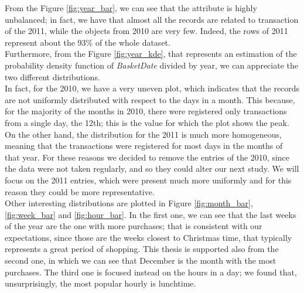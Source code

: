 From the Figure \ref{fig:year_bar}, we can see that the attribute is highly unbalanced; in fact, we have that almost all the records are related to transaction of the 2011, while the objects from 2010 are very few. Indeed, the rows of 2011 represent about the 93\% of the whole dataset. \\
Furthermore, from the Figure \ref{fig:year_kde}, that represents an estimation of the probability density function of \emph{BasketDate} divided by year, we can appreciate the two different distributions.\\
In fact, for the 2010, we have a very uneven plot, which indicates that the records are not uniformly distributed with respect to the days in a month. This because, for the majority of the months in 2010, there were registered only transactions from a single day, the 12th; this is the value for which the plot shows the peak. On the other hand, the distribution for the 2011 is much more homogeneous, meaning that the transactions were registered for most days in the months of that year. For these reasons we decided to remove the entries of the 2010, since the data were not taken regularly, and so they could alter our next study. We will focus on the 2011 entries, which were present much more uniformly and for this reason they could be more representative. \\ 
Other interesting distributions are plotted in Figure \ref{fig:month_bar}, \ref{fig:week_bar} and \ref{fig:hour_bar}. In the first one, we can see that the last weeks of the year are the one with more purchases; that is consistent with our expectations, since those are the weeks closest to Christmas time, that typically represents a great period of shopping. This thesis is supported also from the second one, in which we can see that December is the month with the most purchases. The third one is focused instead on the hours in a day; we found that, unsurprisingly, the most popular hourly is lunchtime.

